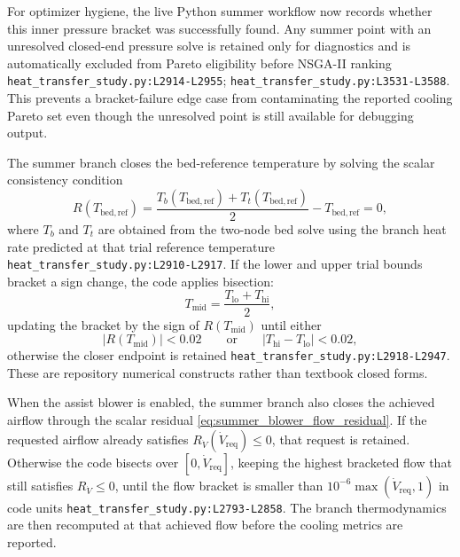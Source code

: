 \documentclass[11pt]{article}
\newcommand{\srcref}[1]{\nolinkurl{#1}}
\begin{document}
For optimizer hygiene, the live Python summer workflow now records whether this inner pressure bracket was successfully found. Any summer point with an unresolved closed-end pressure solve is retained only for diagnostics and is automatically excluded from Pareto eligibility before NSGA-II ranking \srcref{heat_transfer_study.py:L2914-L2955}; \srcref{heat_transfer_study.py:L3531-L3588}. This prevents a bracket-failure edge case from contaminating the reported cooling Pareto set even though the unresolved point is still available for debugging output.

The summer branch closes the bed-reference temperature by solving the scalar consistency condition
\begin{equation}
\label{eq:summer_bed_reference_residual}
R(T_{\mathrm{bed,ref}})=\frac{T_b(T_{\mathrm{bed,ref}})+T_t(T_{\mathrm{bed,ref}})}{2}-T_{\mathrm{bed,ref}}=0,
\end{equation}
where \(T_b\) and \(T_t\) are obtained from the two-node bed solve using the branch heat rate predicted at that trial reference temperature \srcref{heat_transfer_study.py:L2910-L2917}. If the lower and upper trial bounds bracket a sign change, the code applies bisection:
\begin{equation}
\label{eq:summer_bisection_midpoint}
T_{\mathrm{mid}}=\frac{T_{\mathrm{lo}}+T_{\mathrm{hi}}}{2},
\end{equation}
updating the bracket by the sign of \(R(T_{\mathrm{mid}})\) until either
\begin{equation}
\label{eq:summer_bisection_stop}
\left|R(T_{\mathrm{mid}})\right|<0.02
\qquad \text{or} \qquad
\left|T_{\mathrm{hi}}-T_{\mathrm{lo}}\right|<0.02,
\end{equation}
otherwise the closer endpoint is retained \srcref{heat_transfer_study.py:L2918-L2947}. These are repository numerical constructs rather than textbook closed forms.

When the assist blower is enabled, the summer branch also closes the achieved airflow through the scalar residual \eqref{eq:summer_blower_flow_residual}. If the requested airflow already satisfies \(R_{\dot V}(\dot V_{\mathrm{req}})\le 0\), that request is retained. Otherwise the code bisects over \([0,\dot V_{\mathrm{req}}]\), keeping the highest bracketed flow that still satisfies \(R_{\dot V}\le 0\), until the flow bracket is smaller than \(10^{-6}\max(\dot V_{\mathrm{req}},1)\) in code units \srcref{heat_transfer_study.py:L2793-L2858}. The branch thermodynamics are then recomputed at that achieved flow before the cooling metrics are reported.
\end{document}
